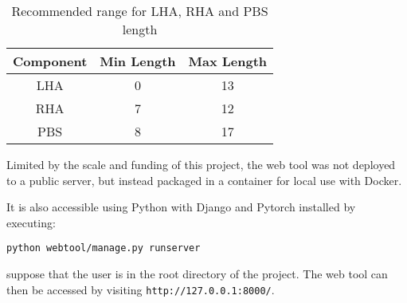 \begin{table}[h]
    \centering
    \begin{tabular}{c|c|c}
        \textbf{Component} & \textbf{Min Length} & \textbf{Max Length} \\
        \hline
        LHA & 0 & 13 \\
        RHA & 7 & 12 \\
        PBS & 8 & 17 \\
    \end{tabular}
    \caption{Recommended range for LHA, RHA and PBS length}
    \label{tab:recommended-range}
\end{table}


Limited by the scale and funding of this project, the web tool was not deployed to a public server, but instead packaged in a container for local use with Docker. 

It is also accessible using Python with Django and Pytorch installed by executing:

\verb|python webtool/manage.py runserver|

suppose that the user is in the root directory of the project. The web tool can then be accessed by visiting \verb|http://127.0.0.1:8000/|.